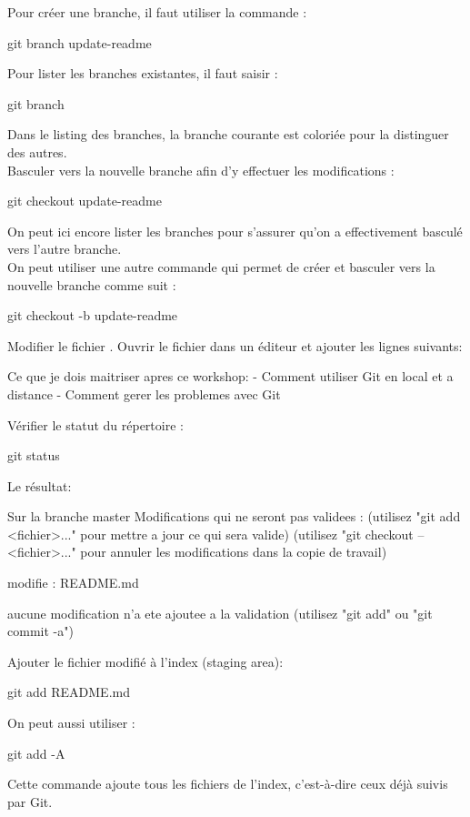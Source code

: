 \documentclass[11pt, a4paper]{book}
\begin{document}
Pour créer une branche, il faut utiliser la commande :
\begin{bash}
git branch update-readme
\end{bash}
Pour lister les branches existantes, il faut saisir :
\begin{bash}
git branch
\end{bash}
Dans le listing des branches, la branche courante est coloriée pour la distinguer des autres.\\
Basculer vers la nouvelle branche afin d'y effectuer les modifications :
\begin{bash}
git checkout update-readme
\end{bash}
On peut ici encore lister les branches pour s'assurer qu'on a effectivement basculé vers l'autre branche.\\
On peut utiliser une autre commande qui permet de créer et basculer vers la nouvelle branche comme suit :
\begin{bash}
git checkout -b update-readme
\end{bash}
Modifier le fichier . Ouvrir le fichier dans un éditeur et ajouter les lignes suivants:
\begin{bash}
Ce que je dois maitriser apres ce workshop:
- Comment utiliser Git en local et a distance
- Comment gerer les problemes avec Git 
\end{bash}
Vérifier le statut du répertoire :
\begin{bash}
git status
\end{bash}
Le résultat:
\begin{bash}
Sur la branche master
Modifications qui ne seront pas validees :
  (utilisez "git add <fichier>..." pour mettre a jour ce qui sera valide)
  (utilisez "git checkout -- <fichier>..." pour annuler les modifications dans la copie de travail)

	modifie :         README.md

aucune modification n'a ete ajoutee a la validation (utilisez "git add" ou "git commit -a")

\end{bash}Ajouter le fichier modifié à l'index (staging area):
\begin{bash}
git add README.md
\end{bash}
On peut aussi utiliser :
\begin{bash}
git add -A
\end{bash}
Cette commande ajoute tous les fichiers de l'index, c'est-à-dire ceux déjà suivis par  Git.\\
\end{document}

